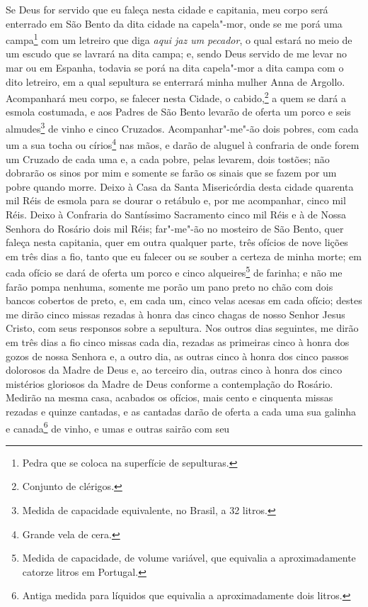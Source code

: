 Se Deus for servido que eu faleça nesta cidade e capitania, meu corpo
será enterrado em São Bento da dita cidade na capela"-mor, onde se me
porá uma campa\footnote{ Pedra que se coloca na superfície de
sepulturas.} com um letreiro que diga \textit{aqui jaz um pecador}, o
qual estará no meio de um escudo que se lavrará na dita campa; e, sendo
Deus servido de me levar no mar ou em Espanha, todavia se porá na dita
capela"-mor a dita campa com o dito letreiro, em a qual sepultura se
enterrará minha mulher Anna de Argollo. Acompanhará meu corpo, se
falecer nesta Cidade, o cabido,\footnote{ Conjunto de clérigos.} a quem
se dará a esmola costumada, e aos Padres de São Bento levarão de oferta
um porco e seis almudes\footnote{ Medida de capacidade equivalente, no
Brasil, a 32 litros.} de vinho e cinco Cruzados. Acompanhar"-me"-ão dois
pobres, com cada um a sua tocha ou círios\footnote{ Grande vela de
cera.} nas mãos, e darão de aluguel à confraria de onde forem um
Cruzado de cada uma e, a cada pobre, pelas levarem, dois tostões; não
dobrarão os sinos por mim e somente se farão os sinais que se fazem por
um pobre quando morre. Deixo à Casa da Santa Misericórdia desta cidade
quarenta mil Réis de esmola para se dourar o retábulo e, por me
acompanhar, cinco mil Réis. Deixo à Confraria do Santíssimo Sacramento
cinco mil Réis e à de Nossa Senhora do Rosário dois mil Réis; far"-me"-ão
no mosteiro de São Bento, quer faleça nesta capitania, quer em outra
qualquer parte, três ofícios de nove lições em três dias a fio, tanto
que eu falecer ou se souber a certeza de minha morte; em cada ofício se
dará de oferta um porco e cinco alqueires\footnote{ Medida de
capacidade, de volume variável, que equivalia a aproximadamente catorze
litros em Portugal.} de farinha; e não me farão pompa nenhuma, somente
me porão um pano preto no chão com dois bancos cobertos de preto, e, em
cada um, cinco velas acesas em cada ofício; destes me dirão cinco
missas rezadas à honra das cinco chagas de nosso Senhor Jesus Cristo,
com seus responsos sobre a sepultura. Nos outros dias seguintes, me
dirão em três dias a fio cinco missas cada dia, rezadas as primeiras
cinco à honra dos gozos de nossa Senhora e, a outro dia, as outras
cinco à honra dos cinco passos dolorosos da Madre de Deus e, ao
terceiro dia, outras cinco à honra dos cinco mistérios gloriosos da
Madre de Deus conforme a contemplação do Rosário. Medirão na mesma
casa, acabados os ofícios, mais cento e cinquenta missas rezadas e
quinze cantadas, e as cantadas darão de oferta a cada uma sua galinha e
canada\footnote{ Antiga medida para líquidos que equivalia a
aproximadamente dois litros.} de vinho, e umas e outras sairão com seu
